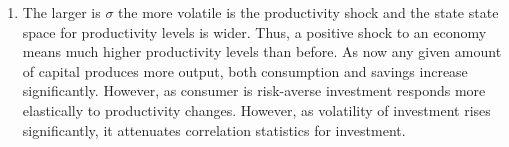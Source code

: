 \documentclass[]{article}
\begin{document}
\begin{enumerate}[label = \alph*)]
	\item The larger is $\sigma$ the more volatile is the productivity shock and the state state space for productivity levels is wider. Thus, a positive shock to an economy means much higher productivity levels than before. As now any given amount of capital produces more output, both consumption and savings increase significantly. However, as consumer is risk-averse investment responds more elastically to productivity changes. However, as volatility of investment rises significantly, it attenuates correlation statistics for investment.
\end{enumerate}
\end{document}
